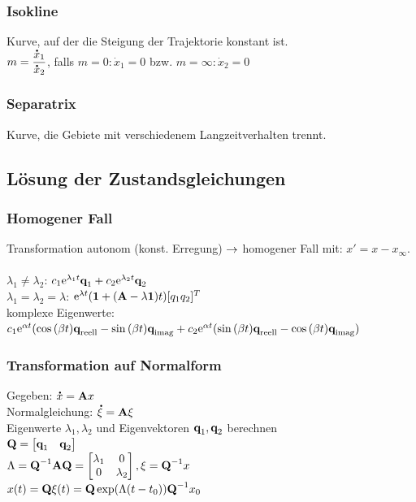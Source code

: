 \documentclass[fs, footer]{latex4ei}
\begin{document}
\begin{multicols*}{4}
		\subsubsection{Isokline}
		Kurve, auf der die Steigung der Trajektorie konstant ist.\\
		$m = \dfrac {\accentset{\mbox{\textrm{\large\bfseries .}} }{x}_1}{\accentset{\mbox{\textrm{\large\bfseries .}} }{x}_2}$, falls $m = 0: \dot x_1 = 0$ bzw. $m = \infty: \dot x_2 = 0$
		\subsubsection{Separatrix}
		Kurve, die Gebiete mit verschiedenem Langzeitverhalten trennt.
	\subsection{Lösung der Zustandsgleichungen}
		\subsubsection{Homogener Fall}
		Transformation autonom (konst. Erregung) $\rightarrow$ homogener Fall mit: $x' = x - x_\infty$.\\ \\
		$\lambda_1 \neq \lambda_2$: $c_1\mathrm{e}^{\lambda_1t}\textbf{q}_1 + c_2\mathrm{e}^{\lambda_2t}\textbf{q}_2$\\
		$\lambda_1 = \lambda_2 = \lambda$: $\mathrm{e}^{\lambda t}(\textbf{1} + (\textbf{A} -\lambda \textbf{1})t) [q_1 q_2]^T$\\
		komplexe Eigenwerte: $c_1 \mathrm{e}^{\alpha t}(\cos{(\beta t)}\textbf{q}_{\text{reell}} - \sin{(\beta t)}\textbf{q}_{\text{imag}} + c_2\mathrm{e}^{\alpha t}(\sin{(\beta t)}\textbf{q}_{\text{reell}} - \cos{(\beta t)}\textbf{q}_{\text{imag}})$\\
		\subsubsection{Transformation auf Normalform}
		Gegeben: $\accentset{\mbox{\textrm{\large\bfseries .}} }{x} = \textbf{A} x$\\
		Normalgleichung: $\accentset{\mbox{\textrm{\large\bfseries .}} }{\xi} = \textbf{A}\xi$\\
		Eigenwerte $\lambda_1, \lambda_2$ und Eigenvektoren $\textbf{q}_1, \textbf{q}_2$ berechnen\\
		$\textbf{Q} =  \begin{bmatrix} \textbf{q}_1 & \textbf{q}_2  \end{bmatrix}$\\
		$\Lambda = \textbf{Q}^{-1}\textbf{A}\textbf{Q} = \begin{bmatrix} \lambda_1 & 0 \\ 0 & \lambda_2  \end{bmatrix}, \xi = \textbf{Q}^{-1} x$\\
		$x(t) = \textbf{Q} \xi(t) = \textbf{Q} \exp(\Lambda(t-t_0))\textbf{Q}^{-1} x_0$\\

\end{multicols*}
\end{document}
